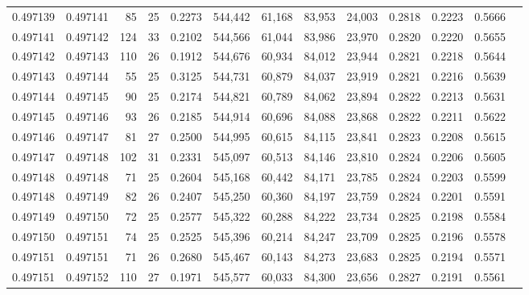 \begin{tabular}{rrrrrrrrrrrrr}
0.497139 & 0.497141 &  85 &  25 &                                     0.2273 & 544,442 &  61,168 &  83,953 &  24,003 & 0.2818 & 0.2223 & 0.5666 \\
0.497141 & 0.497142 & 124 &  33 &                                     0.2102 & 544,566 &  61,044 &  83,986 &  23,970 & 0.2820 & 0.2220 & 0.5655 \\
0.497142 & 0.497143 & 110 &  26 &                                     0.1912 & 544,676 &  60,934 &  84,012 &  23,944 & 0.2821 & 0.2218 & 0.5644 \\
0.497143 & 0.497144 &  55 &  25 &                                     0.3125 & 544,731 &  60,879 &  84,037 &  23,919 & 0.2821 & 0.2216 & 0.5639 \\
0.497144 & 0.497145 &  90 &  25 &                                     0.2174 & 544,821 &  60,789 &  84,062 &  23,894 & 0.2822 & 0.2213 & 0.5631 \\
0.497145 & 0.497146 &  93 &  26 &                                     0.2185 & 544,914 &  60,696 &  84,088 &  23,868 & 0.2822 & 0.2211 & 0.5622 \\
0.497146 & 0.497147 &  81 &  27 &                                     0.2500 & 544,995 &  60,615 &  84,115 &  23,841 & 0.2823 & 0.2208 & 0.5615 \\
0.497147 & 0.497148 & 102 &  31 &                                     0.2331 & 545,097 &  60,513 &  84,146 &  23,810 & 0.2824 & 0.2206 & 0.5605 \\
0.497148 & 0.497148 &  71 &  25 &                                     0.2604 & 545,168 &  60,442 &  84,171 &  23,785 & 0.2824 & 0.2203 & 0.5599 \\
0.497148 & 0.497149 &  82 &  26 &                                     0.2407 & 545,250 &  60,360 &  84,197 &  23,759 & 0.2824 & 0.2201 & 0.5591 \\
0.497149 & 0.497150 &  72 &  25 &                                     0.2577 & 545,322 &  60,288 &  84,222 &  23,734 & 0.2825 & 0.2198 & 0.5584 \\
0.497150 & 0.497151 &  74 &  25 &                                     0.2525 & 545,396 &  60,214 &  84,247 &  23,709 & 0.2825 & 0.2196 & 0.5578 \\
0.497151 & 0.497151 &  71 &  26 &                                     0.2680 & 545,467 &  60,143 &  84,273 &  23,683 & 0.2825 & 0.2194 & 0.5571 \\
0.497151 & 0.497152 & 110 &  27 &                                     0.1971 & 545,577 &  60,033 &  84,300 &  23,656 & 0.2827 & 0.2191 & 0.5561 \\

\end{tabular}
